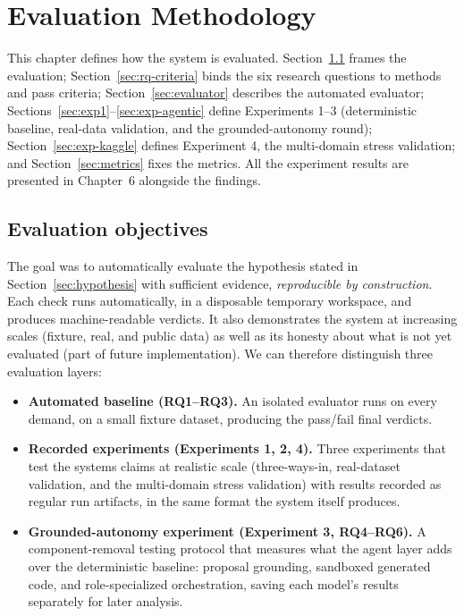 \chapter{Evaluation Methodology}
\label{ch:methodology}

This chapter defines how the system is evaluated. Section~\ref{sec:eval-objectives} frames the evaluation; Section~\ref{sec:rq-criteria} binds the six research questions to methods and pass criteria; Section~\ref{sec:evaluator} describes the automated evaluator; Sections~\ref{sec:exp1}--\ref{sec:exp-agentic} define Experiments 1--3 (deterministic baseline, real-data validation, and the grounded-autonomy round); Section~\ref{sec:exp-kaggle} defines Experiment 4, the multi-domain stress validation; and Section~\ref{sec:metrics} fixes the metrics. All the experiment results are presented in Chapter~6 alongside the findings.

\section{Evaluation objectives}
\label{sec:eval-objectives}

The goal was to automatically evaluate the hypothesis stated in Section~\ref{sec:hypothesis} with sufficient evidence, \emph{reproducible by construction}. Each check runs automatically, in a disposable temporary workspace, and produces machine-readable verdicts. It also demonstrates the system at increasing scales (fixture, real, and public data) as well as its honesty about what is not yet evaluated (part of future implementation). We can therefore distinguish three evaluation layers:

\begin{itemize}
	\item \textbf{Automated baseline (RQ1--RQ3).} An isolated evaluator runs on every demand, on a small fixture dataset, producing the pass/fail final verdicts.
	\item \textbf{Recorded experiments (Experiments 1, 2, 4).} Three experiments that test the systems claims at realistic scale (three-ways-in, real-dataset validation, and the multi-domain stress validation) with results recorded as regular run artifacts, in the same format the system itself produces.
	\item \textbf{Grounded-autonomy experiment (Experiment 3, RQ4--RQ6).} A component-removal testing protocol that measures what the agent layer adds over the deterministic baseline: proposal grounding, sandboxed generated code, and role-specialized orchestration, saving each model's results separately for later analysis.
\end{itemize}

